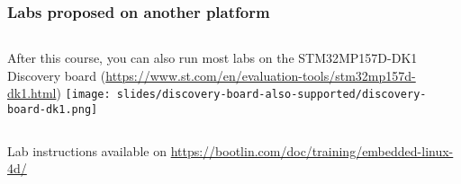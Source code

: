 \begin{frame}
\frametitle{Labs proposed on another platform}
  \begin{columns}[T]
    After this course, you can also run most labs on the STM32MP157D-DK1 Discovery board
    (\url{https://www.st.com/en/evaluation-tools/stm32mp157d-dk1.html})
    \texttt{[image: slides/discovery-board-also-supported/discovery-board-dk1.png]}
  \end{columns}
  \vspace{1cm}
  Lab instructions available on
  \url{https://bootlin.com/doc/training/embedded-linux-4d/}
\end{frame}
